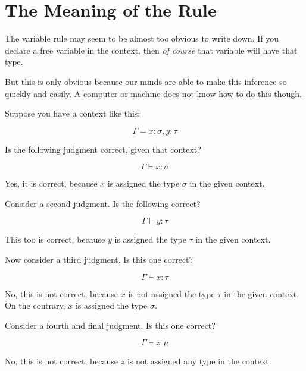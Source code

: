 \documentclass{book}
\numberwithin{equation}{chapter}
\begin{document}
\section{The Meaning of the Rule}

The variable rule may seem to be almost too obvious to write down. If you declare a free variable in the context, then \textit{of course} that variable will have that type.

But this is only obvious because our minds are able to make this inference so quickly and easily. A computer or machine does not know how to do this though.

Suppose you have a context like this:

\begin{equation}
\Gamma = x : \sigma, y : \tau
\end{equation}

\noindent
Is the following judgment correct, given that context?

\begin{equation}
\Gamma \vdash x : \sigma
\end{equation}

\noindent
Yes, it is correct, because $x$ is assigned the type $\sigma$ in the given context.

Consider a second judgment. Is the following correct?

\begin{equation}
\Gamma \vdash y : \tau
\end{equation}

\noindent
This too is correct, because $y$ is assigned the type $\tau$ in the given context.

Now consider a third judgment. Is this one correct?

\begin{equation}
\Gamma \vdash x : \tau
\end{equation}

\noindent
No, this is not correct, because $x$ is not assigned the type $\tau$ in the given context. On the contrary, $x$ is assigned the type $\sigma$.

Consider a fourth and final judgment. Is this one correct?

\begin{equation}
\Gamma \vdash z : \mu
\end{equation}

\noindent
No, this is not correct, because $z$ is not assigned any type in the context.
\end{document}
